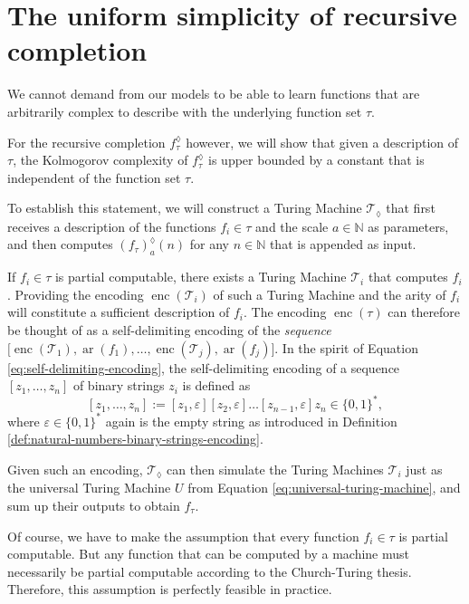 \section{The uniform simplicity of recursive completion}
\label{sec:uniform-simplicity-recursive-completion}
We cannot demand from our models to be able to learn functions that are arbitrarily complex to describe with the underlying function set $\tau$.

For the recursive completion $f_{\tau}^{\lozenge}$ however, we will show that given a description of $\tau$, the Kolmogorov complexity of $f_{\tau}^{\lozenge}$ is upper bounded by a constant that is independent of the function set $\tau$.

To establish this statement, we will construct a Turing Machine $\mathcal{T}_{\lozenge}$ that first receives a description of the functions $f_i\in\tau$ and the scale $a\in\mathbb{N}$ as parameters, and then computes $\left(f_{\tau}\right)_a^{\lozenge}(n)$ for any $n\in\mathbb{N}$ that is appended as input. 

If $f_i \in\tau$ is partial computable, there exists a Turing Machine $\mathcal{T}_i$ that computes $f_i$.
Providing the encoding $\operatorname{enc}(\mathcal{T}_i)$ of such a Turing Machine and the arity of $f_i$ will constitute a sufficient description of $f_i$.
The encoding $\operatorname{enc}(\tau)$ can therefore be thought of as a self-delimiting encoding of the \textit{sequence} $\bigl[\operatorname{enc}(\mathcal{T}_1),\operatorname{ar}(f_1),\dots,\operatorname{enc}(\mathcal{T}_j),\operatorname{ar}(f_j)\bigr]$.
In the spirit of Equation \ref{eq:self-delimiting-encoding}, the self-delimiting encoding of a sequence $[z_1,\dots,z_n]$ of binary strings $z_i$ is defined as
\begin{equation}
	\label{eq:self-delimiting-enc-sequence}
	[z_1,\dots,z_n]:=[z_1,\varepsilon][z_2,\varepsilon]\dots[z_{n-1},\varepsilon]z_n\in\{0,1\}^{*},
\end{equation}
where $\varepsilon\in\{0,1\}^{*}$ again is the empty string as introduced in Definition \ref{def:natural-numbers-binary-strings-encoding}.

Given such an encoding, $\mathcal{T}_{\lozenge}$ can then simulate the Turing Machines $\mathcal{T}_i$ just as the universal Turing Machine $U$ from Equation \ref{eq:universal-turing-machine}, and sum up their outputs to obtain $f_{\tau}$.

Of course, we have to make the assumption that every function $f_i\in\tau$ is partial computable.
But any function that can be computed by a machine must necessarily be partial computable according to the Church-Turing thesis.
Therefore, this assumption is perfectly feasible in practice.  

